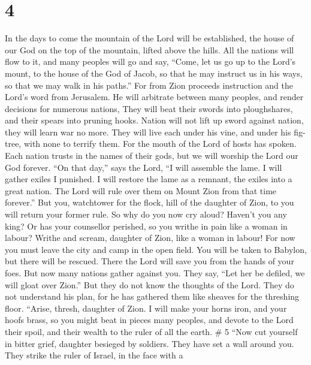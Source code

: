 \hypertarget{section-3}{%
\section{4}\label{section-3}}

 In the days to come the mountain of the Lord will be
established, the house of our God on the top of the mountain, lifted
above the hills. All the nations will flow to it,  and many
peoples will go and say, ``Come, let us go up to the Lord's mount, to
the house of the God of Jacob, so that he may instruct us in his ways,
so that we may walk in his paths.'' For from Zion proceeds instruction
and the Lord's word from Jerusalem.  He will arbitrate
between many peoples, and render decisions for numerous nations, They
will beat their swords into ploughshares, and their spears into pruning
hooks. Nation will not lift up sword against nation, they will learn war
no more.  They will live each under his vine, and under his
fig-tree, with none to terrify them. For the mouth of the Lord of hosts
has spoken.  Each nation trusts in the names of their gods,
but we will worship the Lord our God forever.  ``On that
day,'' says the Lord, ``I will assemble the lame. I will gather exiles I
punished.  I will restore the lame as a remnant, the exiles
into a great nation. The Lord will rule over them on Mount Zion from
that time forever.''  But you, watchtower for the flock,
hill of the daughter of Zion, to you will return your former rule.
 So why do you now cry aloud? Haven't you any king? Or has
your counsellor perished, so you writhe in pain like a woman in labour?
 Writhe and scream, daughter of Zion, like a woman in
labour! For now you must leave the city and camp in the open field. You
will be taken to Babylon, but there will be rescued. There the Lord will
save you from the hands of your foes.  But now many nations
gather against you. They say, ``Let her be defiled, we will gloat over
Zion.''  But they do not know the thoughts of the Lord.
They do not understand his plan, for he has gathered them like sheaves
for the threshing floor.  ``Arise, thresh, daughter of
Zion. I will make your horns iron, and your hoofs brass, so you might
beat in pieces many peoples, and devote to the Lord their spoil, and
their wealth to the ruler of all the earth. \# 5  ``Now cut
yourself in bitter grief, daughter besieged by soldiers. They have set a
wall around you. They strike the ruler of Israel, in the face with a
